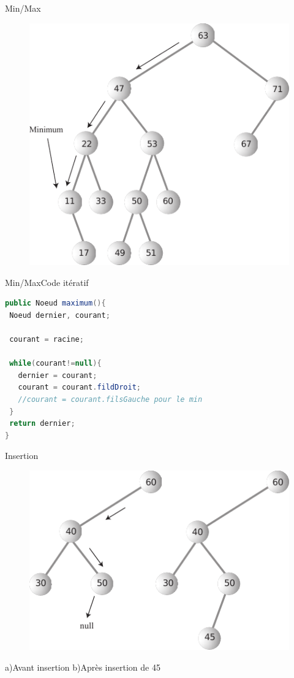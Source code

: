 \documentclass[12pt,a4paper]{beamer}
\begin{document}
\begin{frame}{Min/Max}

\begin{figure}
\includegraphics[scale=1]{figs/max_tree}
\end{figure}
\end{frame}

\begin{frame}[fragile]{Min/Max}{Code itératif}
\begin{lstlisting}[language=Java]
public Noeud maximum(){
 Noeud dernier, courant;
 
 courant = racine; 
 
 while(courant!=null){
   dernier = courant;
   courant = courant.fildDroit; 
   //courant = courant.filsGauche pour le min
 }
 return dernier;
}
\end{lstlisting}
\end{frame}


\begin{frame}{Insertion}
\begin{figure}
\includegraphics[scale=1]{figs/tree_insertion}
\end{figure}
\hspace{3em}a)Avant insertion  \hspace{1em}  b)Après insertion de 45
\end{frame}
\end{document}
